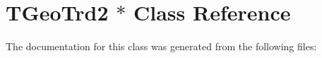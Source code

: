 \hypertarget{class_t_geo_trd2_01_5}{}\section{T\+Geo\+Trd2 $\ast$ Class Reference}
\label{class_t_geo_trd2_01_5}


The documentation for this class was generated from the following files\+: